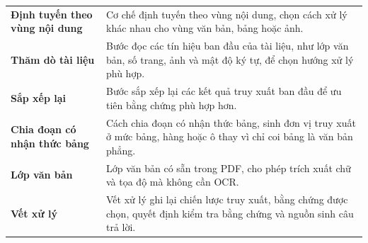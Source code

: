 \documentclass[../DoAn.tex]{subfiles}
\begin{document}
\begin{longtable}{
    @{}
    >{\raggedright\arraybackslash}p{}
    >{\raggedright\arraybackslash}p{}
    @{}
}
\textbf{Định tuyến theo vùng nội dung}
& Cơ chế định tuyến theo vùng nội dung, chọn cách xử lý khác nhau cho vùng văn bản, bảng hoặc ảnh. \\

\textbf{Thăm dò tài liệu}
& Bước đọc các tín hiệu ban đầu của tài liệu, như lớp văn bản, số trang, ảnh và mật độ ký tự, để chọn hướng xử lý phù hợp. \\

\textbf{Sắp xếp lại}
& Bước sắp xếp lại các kết quả truy xuất ban đầu để ưu tiên bằng chứng phù hợp hơn. \\

\textbf{Chia đoạn có nhận thức bảng}
& Cách chia đoạn có nhận thức bảng, sinh đơn vị truy xuất ở mức bảng, hàng hoặc ô thay vì chỉ coi bảng là văn bản phẳng. \\

\textbf{Lớp văn bản}
& Lớp văn bản có sẵn trong PDF, cho phép trích xuất chữ và tọa độ mà không cần OCR. \\

\textbf{Vết xử lý}
& Vết xử lý ghi lại chiến lược truy xuất, bằng chứng được chọn, quyết định kiểm tra bằng chứng và nguồn sinh câu trả lời. \\

\end{longtable}
\end{document}
